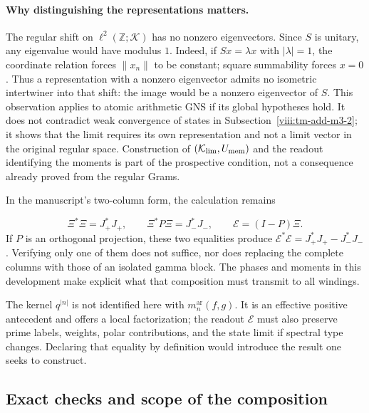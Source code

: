 \paragraph{Why distinguishing the representations matters.}
The regular shift on \(\ell^2(\mathbb Z;\mathcal K)\)
has no nonzero eigenvectors. Since \(S\) is unitary, any
eigenvalue would have modulus \(1\). Indeed, if \(Sx=\lambda x\)
with \(|\lambda|=1\), the coordinate relation forces
\(\|x_n\|\) to be constant; square summability forces \(x=0\).
Thus a representation with a nonzero eigenvector admits
no isometric intertwiner into that shift: the image would be
a nonzero eigenvector of \(S\). This observation applies to
atomic arithmetic GNS if its global hypotheses hold. It does not
contradict weak convergence of states in
Subsection~\ref{viii:tm-add-m3-2}; it shows that the limit requires its own
representation and not a limit vector in the original regular space.
Construction of \((\mathcal K_{\rm lim},U_{\rm mem})\) and the
readout identifying the moments is part of the prospective condition,
not a consequence already proved from the regular Grams.

In the manuscript's two-column form, the calculation remains

\[
\Xi^*\Xi=J_+^*J_+,\qquad
\Xi^*P\Xi=J_-^*J_-,\qquad
\mathcal E=(I-P)\Xi.
\]
If \(P\) is an orthogonal projection, these two equalities produce \(\mathcal E^*\mathcal E=J_+^*J_+-J_-^*J_-\). Verifying only one of them does not suffice, nor does replacing the complete columns with those of an isolated gamma block. The phases and moments in this development make explicit what that composition must transmit to all windings.

The kernel \(q^{|n|}\) is not identified here with \(m_n^{\mathrm{ar}}(f,g)\). It is an effective positive antecedent and offers a local factorization; the readout \(\mathcal E\) must also preserve prime labels, weights, polar contributions, and the state limit if spectral type changes. Declaring that equality by definition would introduce the result one seeks to construct.


\subsection{Exact checks and scope of the composition}
\label{viii:tm-add-m8}

